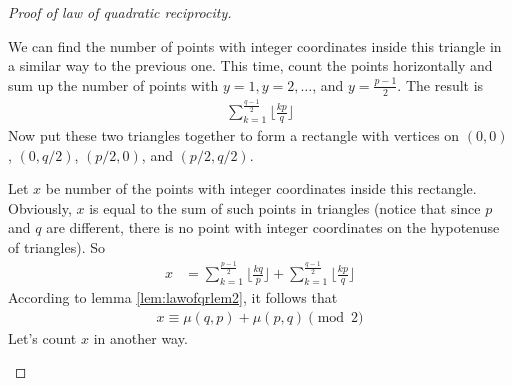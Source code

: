 \documentclass{subfile}
\begin{document}
\begin{proof}[Proof of law of quadratic reciprocity]
\begin{center}
	\end{center}
	We can find the number of points with integer coordinates inside this triangle in a similar way to the previous one. This time, count the points horizontally and sum up the number of points with $y=1, y=2, \ldots$, and $y=\frac{p-1}{2}$. The result is
		\begin{align*}
			\sum_{k=1}^{\frac{q-1}{2}} \Big\lfloor\frac{kp}{q} \Big\rfloor
		\end{align*}
	Now put these two triangles together to form a rectangle with vertices on $(0,0)$, $\left(0,q/2\right)$, $\left(p/2,0\right)$, and $\left(p/2,q/2\right)$.

	Let $x$ be number of the points with integer coordinates inside this rectangle. Obviously, $x$ is equal to the sum of such points in triangles (notice that since $p$ and $q$ are different, there is no point with integer coordinates on the hypotenuse of triangles). So
	\begin{align*}
		x
			& = \sum_{k=1}^{\frac{p-1}{2}} \Big\lfloor\frac{kq}{p} \Big\rfloor+ \sum_{k=1}^{\frac{q-1}{2}} \Big\lfloor\frac{kp}{q} \Big\rfloor
	\end{align*}
	According to lemma \eqref{lem:lawofqrlem2}, it follows that
	\begin{align}\label{eq:qrlawproof1}
	x \equiv \mu(q,p)+\mu(p,q) \pmod 2
	\end{align}
	Let's count $x$ in another way.
	\begin{center}
\end{center}
\end{proof}
\end{document}
